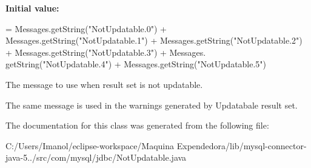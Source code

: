 {\bfseries Initial value\+:}
\begin{DoxyCode}
= Messages.getString(\textcolor{stringliteral}{"NotUpdatable.0"}) + Messages.getString(\textcolor{stringliteral}{"NotUpdatable.1"})
            + Messages.getString(\textcolor{stringliteral}{"NotUpdatable.2"}) + Messages.getString(\textcolor{stringliteral}{"NotUpdatable.3"}) + Messages.
      getString(\textcolor{stringliteral}{"NotUpdatable.4"})
            + Messages.getString(\textcolor{stringliteral}{"NotUpdatable.5"})
\end{DoxyCode}
The message to use when result set is not updatable.

The same message is used in the warnings generated by Updatabale result set. 

The documentation for this class was generated from the following file\+:\begin{DoxyCompactItemize}
\item 
C\+:/\+Users/\+Imanol/eclipse-\/workspace/\+Maquina Expendedora/lib/mysql-\/connector-\/java-\/5../src/com/mysql/jdbc/Not\+Updatable.\+java\end{DoxyCompactItemize}
